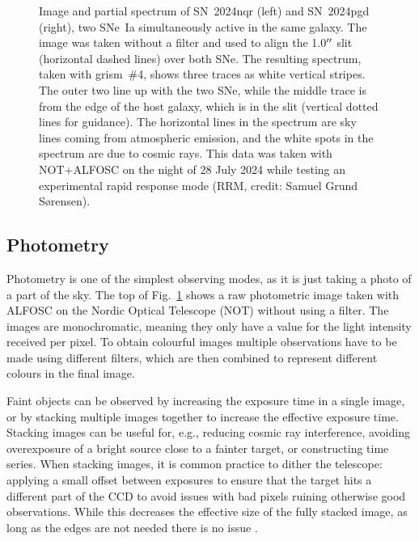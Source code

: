 \documentclass[a4paper,oneside,12pt, class=Latex/Classes/PhDthesisPSnPDF, crop=false]{standalone}
\begin{document}
\begin{figure}
    \caption{Image and partial spectrum of SN~2024nqr (left) and SN~2024pgd (right), two SNe~Ia simultaneously active in the same galaxy. The image was taken without a filter and used to align the 1.0$^{\prime\prime}$ slit (horizontal dashed lines) over both SNe. The resulting spectrum, taken with grism~\#4, shows three traces as white vertical stripes. The outer two line up with the two SNe, while the middle trace is from the edge of the host galaxy, which is in the slit (vertical dotted lines for guidance). The horizontal lines in the spectrum are sky lines coming from atmospheric emission, and the white spots in the spectrum are due to cosmic rays. This data was taken with NOT+ALFOSC on the night of 28 July 2024 while testing an experimental rapid response mode (RRM, credit: Samuel Grund S\o rensen).} %
    \label{phot_spec_example}
\end{figure}

\subsection{Photometry}
Photometry is one of the simplest observing modes, as it is just taking a photo of a part of the sky. The top of Fig.~\ref{phot_spec_example} shows a raw photometric image taken with ALFOSC on the Nordic Optical Telescope (NOT) without using a filter. The images are monochromatic, meaning they only have a value for the light intensity received per pixel. To obtain colourful images multiple observations have to be made using different filters, which are then combined to represent different colours in the final image.

Faint objects can be observed by increasing the exposure time in a single image, or by stacking multiple images together to increase the effective exposure time. Stacking images can be useful for, e.g., reducing cosmic ray interference, avoiding overexposure of a bright source close to a fainter target, or constructing time series. When stacking images, it is common practice to dither the telescope: applying a small offset between exposures to ensure that the target hits a different part of the CCD to avoid issues with bad pixels ruining otherwise good observations. While this decreases the effective size of the fully stacked image, as long as the edges are not needed there is no issue \citep{Stacking_I, Stacking_II}.
\end{document}
